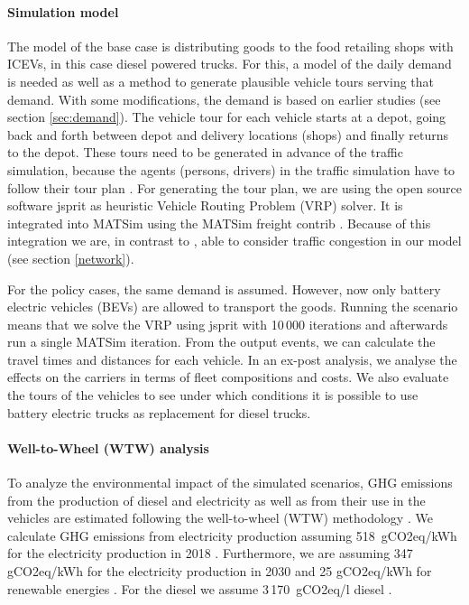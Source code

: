 \paragraph{Simulation model}
The model of the base case is distributing goods to the food retailing shops with ICEVs, in this case diesel powered trucks. 
For this, a model of the daily demand is needed as well as a method to generate plausible vehicle tours serving that demand. 
With some modifications, the demand is based on earlier studies (see section \ref{sec:demand}). 
The vehicle tour for each vehicle starts at a depot, going back and forth between depot and delivery locations (shops) and finally returns to the depot. 
These tours need to be generated in advance of the traffic simulation, because the agents (persons, drivers) in the traffic simulation have to follow their tour plan \cite{ZilskeJoubert2015FreightTrafficInBook}.
For generating the tour plan, we are using the open source software jsprit \cite{JspritGithub2018} as heuristic Vehicle Routing Problem (VRP) solver. It is integrated into MATSim using the MATSim freight contrib \cite{ZilskeJoubert2015FreightTrafficInBook}. 
Because of this integration we are, in contrast to \cite{Ehmke2012RoutingInCityLogistics}, able to consider traffic congestion in our model (see section \ref{network}).

For the policy cases, the same demand is assumed. However, now only battery electric vehicles (BEVs) are allowed to transport the goods.
Running the scenario means that we solve the VRP using jsprit with 10\,000 iterations and afterwards run a single MATSim iteration.
From the output events, we can calculate the travel times and distances for each vehicle. In an ex-post analysis, we analyse the effects on the carriers in terms of fleet compositions and costs. 
We also evaluate the tours of the vehicles to see under which conditions it is possible to use battery electric trucks as replacement for diesel trucks. 

\paragraph*{Well-to-Wheel (WTW) analysis}
To analyze the environmental impact of the simulated scenarios, GHG emissions from the production of diesel and electricity as well as from their use in the vehicles are estimated following the well-to-wheel (WTW) methodology \cite{jrc2014well}. 
We calculate GHG emissions from electricity production assuming 518~gCO2eq/kWh for the electricity production in 2018 \cite{IchaKuhs2019UBA_Strommix}.
Furthermore, we are assuming 347 gCO2eq/kWh for the electricity production in 2030 and 25 gCO2eq/kWh for renewable energies 
\cite{Wietschel2019THGElektroFzg}.
For the diesel we assume 3\,170~gCO2eq/l diesel \cite{DINEN16258}.

